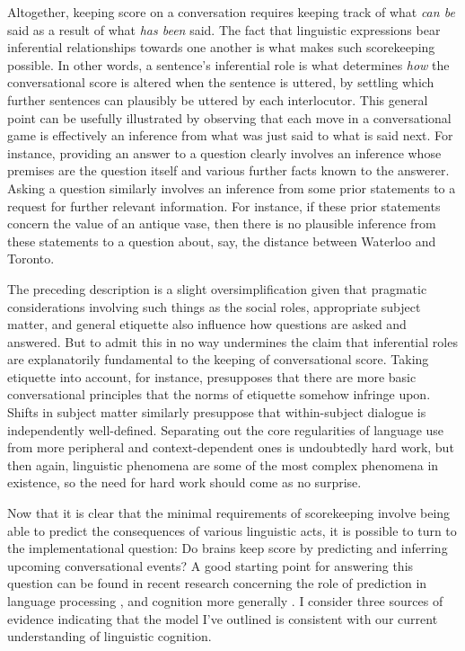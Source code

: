 Altogether, keeping score on a conversation requires keeping track of what \textit{can be} said as a result of what \textit{has been} said. The fact that linguistic expressions bear inferential relationships towards one another is what makes such scorekeeping possible. In other words, a sentence's inferential role is what determines \textit{how} the conversational score is altered when the sentence is uttered, by settling which further sentences can plausibly be uttered by each interlocutor. This general point can be usefully illustrated by observing that each move in a conversational game is effectively an inference from what was just said to what is said next. For instance, providing an answer to a question clearly involves an inference whose premises are the question itself and various further facts known to the answerer. Asking a question similarly involves an inference from some prior statements to a request for further relevant information. For instance, if these prior statements concern the value of an antique vase, then there is no plausible inference from these statements to a question about, say, the distance between Waterloo and Toronto.  

The preceding description is a slight oversimplification given that pragmatic considerations involving such things as the social roles, appropriate subject matter, and general etiquette also influence how questions are asked and answered. But to admit this in no way undermines the claim that inferential roles are explanatorily fundamental to the keeping of conversational score. Taking etiquette into account, for instance, presupposes that there are more basic conversational principles that the norms of etiquette somehow infringe upon. Shifts in subject matter similarly presuppose that within-subject dialogue is independently well-defined. Separating out the core regularities of language use from more peripheral and context-dependent ones is undoubtedly hard work, but then again, linguistic phenomena are some of the most complex phenomena in existence, so the need for hard work should come as no surprise.

Now that it is clear that the minimal requirements of scorekeeping involve being able to predict the consequences of various linguistic acts, it is possible to turn to the implementational question: Do brains keep score by predicting and inferring upcoming conversational events? A good starting point for answering this question can be found in recent research concerning the role of prediction in language processing \citep{Pickering:2013,Pickering:2007,Christiansen:2015}, and cognition more generally \citep{clark:2013}. I consider three sources of evidence indicating that the model I've outlined is consistent with our current understanding of linguistic cognition.

